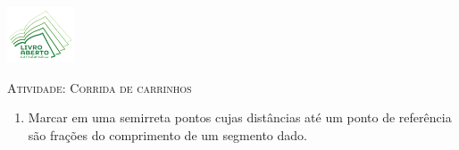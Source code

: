 \documentclass[10 pt,usenames,dvipsnames, oneside]{article}
\begin{document}
\begin{center}
  \begin{minipage}[l]{3cm}
\includegraphics[width=2cm]{../../../Figuras/logo}       
\end{minipage}\hfill
\begin{minipage}[r]{.8\textwidth}
 {\Large \scshape Atividade: Corrida de carrinhos}  
\end{minipage}
\end{center}
\vspace{.2cm}

\ifdefined\prof
\begin{goals}
\begin{enumerate}

    \item       Marcar em uma semirreta pontos cujas distâncias até um ponto de referência são frações do comprimento de um segmento dado.

\end{enumerate}
\tcblower


\end{goals}
\end{document}
